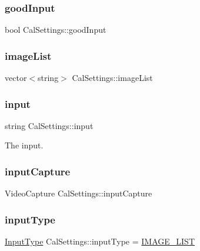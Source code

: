 \subsubsection{\texorpdfstring{goodInput}{goodInput}}
{\footnotesize\ttfamily bool Cal\+Settings\+::good\+Input}

\mbox{\label{class_cal_settings_a93efb0e90500e865060c8ed64ca19c7e}} 
\subsubsection{\texorpdfstring{imageList}{imageList}}
{\footnotesize\ttfamily vector$<$string$>$ Cal\+Settings\+::image\+List}

\mbox{\label{class_cal_settings_af5c2593c9b0ede5badd13709641582c9}} 
\subsubsection{\texorpdfstring{input}{input}}
{\footnotesize\ttfamily string Cal\+Settings\+::input}



The input. 

\mbox{\label{class_cal_settings_a43c759c4226fc06b1cb823e1d93e61c7}} 
\subsubsection{\texorpdfstring{inputCapture}{inputCapture}}
{\footnotesize\ttfamily Video\+Capture Cal\+Settings\+::input\+Capture}

\mbox{\label{class_cal_settings_a8ca51064aed3517fc742fd81c81b8315}} 
\subsubsection{\texorpdfstring{inputType}{inputType}}
{\footnotesize\ttfamily \mbox{\hyperlink{class_cal_settings_aeec3099e1fed6e349e9e006004bc3d58}{Input\+Type}} Cal\+Settings\+::input\+Type = \mbox{\hyperlink{class_cal_settings_aeec3099e1fed6e349e9e006004bc3d58a42620be27f3baf3945f97c4a0451b56a}{I\+M\+A\+G\+E\+\_\+\+L\+I\+ST}}}

